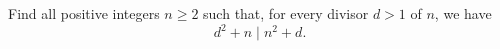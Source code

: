 Find all positive integers $n \geq 2$ such that, for every divisor $d> 1$ of $n$, we have
$$d^2+n \mid n^2+d.$$

